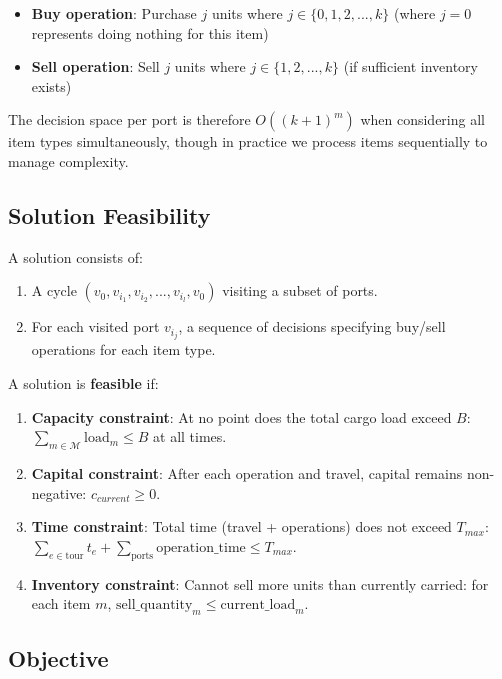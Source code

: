 \documentclass[12pt]{article}
\begin{document}
\begin{itemize}
    \item \textbf{Buy operation}: Purchase $j$ units where $j \in \{0, 1, 2, ..., k\}$ (where $j=0$ represents doing nothing for this item)
    \item \textbf{Sell operation}: Sell $j$ units where $j \in \{1, 2, ..., k\}$ (if sufficient inventory exists)
\end{itemize}

The decision space per port is therefore $O((k+1)^m)$ when considering all item types simultaneously, though in practice we process items sequentially to manage complexity.

\subsection{Solution Feasibility}

A solution consists of:
\begin{enumerate}
    \item A cycle $(v_0, v_{i_1}, v_{i_2}, ..., v_{i_l}, v_0)$ visiting a subset of ports.
    \item For each visited port $v_{i_j}$, a sequence of decisions specifying buy/sell operations for each item type.
\end{enumerate}

A solution is \textbf{feasible} if:
\begin{enumerate}
    \item \textbf{Capacity constraint}: At no point does the total cargo load exceed $B$: $\sum_{m \in \mathcal{M}} \text{load}_m \leq B$ at all times.
    \item \textbf{Capital constraint}: After each operation and travel, capital remains non-negative: $c_{current} \geq 0$.
    \item \textbf{Time constraint}: Total time (travel + operations) does not exceed $T_{max}$: $\sum_{e \in \text{tour}} t_e + \sum_{\text{ports}} \text{operation\_time} \leq T_{max}$.
    \item \textbf{Inventory constraint}: Cannot sell more units than currently carried: for each item $m$, $\text{sell\_quantity}_m \leq \text{current\_load}_m$.
\end{enumerate}

\subsection{Objective}
\end{document}
